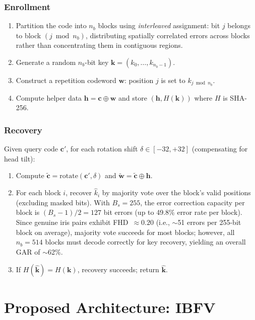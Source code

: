\documentclass[conference]{IEEEtran}
\newcommand{\IBFV}{\textsf{IBFV}}
\begin{document}
\subsubsection{Enrollment}
\begin{enumerate}
    \item Partition the code into $n_b$ blocks using \emph{interleaved} assignment: bit $j$ belongs to block $(j \bmod n_b)$, distributing spatially correlated errors across blocks rather than concentrating them in contiguous regions.
    \item Generate a random $n_b$-bit key $\mathbf{k} = (k_0, \ldots, k_{n_b-1})$.
    \item Construct a repetition codeword $\mathbf{w}$: position $j$ is set to $k_{j \bmod n_b}$.
    \item Compute helper data $\mathbf{h} = \mathbf{c} \oplus \mathbf{w}$ and store $(\mathbf{h}, H(\mathbf{k}))$ where $H$ is SHA-256.
\end{enumerate}

\subsubsection{Recovery}
Given query code $\mathbf{c}'$, for each rotation shift $\delta \in [-32, +32]$ (compensating for head tilt):
\begin{enumerate}
    \item Compute $\tilde{\mathbf{c}} = \text{rotate}(\mathbf{c}', \delta)$ and $\tilde{\mathbf{w}} = \tilde{\mathbf{c}} \oplus \mathbf{h}$.
    \item For each block $i$, recover $\hat{k}_i$ by majority vote over the block's valid positions (excluding masked bits). With $B_s = 255$, the error correction capacity per block is $(B_s - 1)/2 = 127$ bit errors (up to 49.8\% error rate per block). Since genuine iris pairs exhibit FHD~$\approx 0.20$ (i.e., $\sim$51 errors per 255-bit block on average), majority vote succeeds for most blocks; however, all $n_b = 514$ blocks must decode correctly for key recovery, yielding an overall GAR of $\sim$62\%.
    \item If $H(\hat{\mathbf{k}}) = H(\mathbf{k})$, recovery succeeds; return $\hat{\mathbf{k}}$.
\end{enumerate}

\section{Proposed Architecture: \IBFV{}}
\label{sec:proposed}
\end{document}
